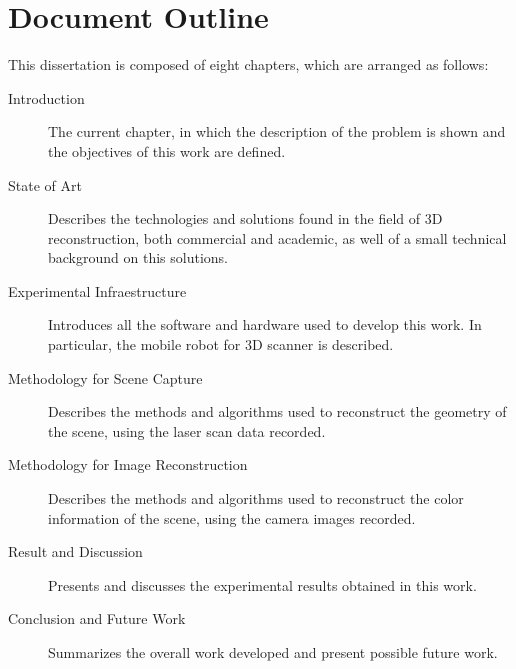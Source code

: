 \section{Document Outline}

This dissertation is composed of eight chapters, which are arranged as follows:

\begin{description}
    \item[Introduction] The current chapter, in which the description of the problem is shown and the objectives of this work are defined.
    \item[State of Art] Describes the technologies and solutions found in the field of 3D reconstruction, both commercial and academic, as well of a small technical background on this solutions.
    \item[Experimental Infraestructure] Introduces all the software and hardware used to develop this work. In particular, the mobile robot for 3D scanner is described.
    \item[Methodology for Scene Capture] Describes the methods and algorithms used to reconstruct the geometry of the scene, using the laser scan data recorded.
    \item[Methodology for Image Reconstruction] Describes the methods and algorithms used to reconstruct the color information of the scene, using the camera images recorded.
    \item[Result and Discussion] Presents and discusses the experimental results obtained in this work.
    \item[Conclusion and Future Work] Summarizes the overall work developed and present possible future work.
\end{description}